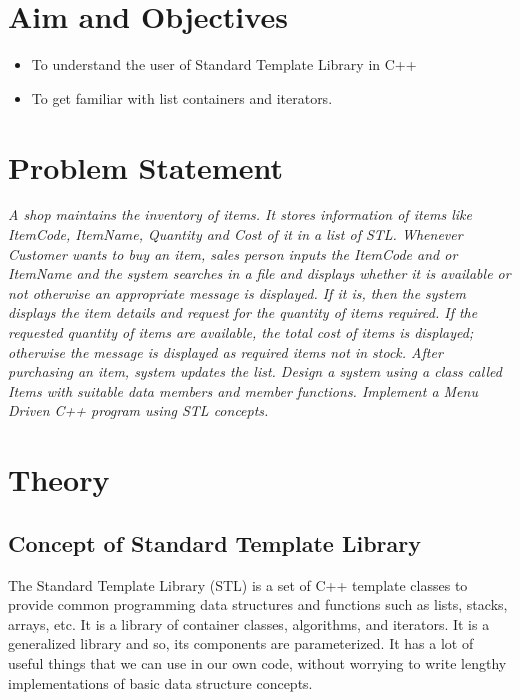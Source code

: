\documentclass[11pt]{article}
\begin{document}
\tableofcontents
\thispagestyle{empty}
\clearpage


\setcounter{page}{1}

\section{Aim and Objectives}
\begin{itemize}
	\item To understand the user of Standard Template Library in C++
	\item To get familiar with list containers and iterators.
\end{itemize}
\section{Problem Statement}
\textit{	A shop maintains the inventory of items. It stores information of items like ItemCode, ItemName, Quantity and Cost of it in a list of STL. Whenever Customer wants to buy an item, sales person inputs the ItemCode and or ItemName and the system searches in a
	file and displays whether it is available or not otherwise an appropriate message is displayed. If it is, then the system displays the item details and request for the quantity of items required. If the requested quantity of items are available, the total cost of items is
	displayed; otherwise the message is displayed as required items not in stock. After purchasing an item, system updates the list.
	Design a system using a class called Items with suitable data members and member functions. Implement a Menu Driven C++ program using STL concepts.}

\section{Theory}
\subsection{Concept of Standard Template Library}
The Standard Template Library (STL) is a set of C++ template classes to provide common programming data structures and functions such as lists, stacks, arrays, etc. It is a library of container classes, algorithms, and iterators. It is a generalized library and so, its components are parameterized. It has a lot of useful things that we can use in our own code, without worrying to write lengthy implementations of basic data structure concepts.
\end{document}
